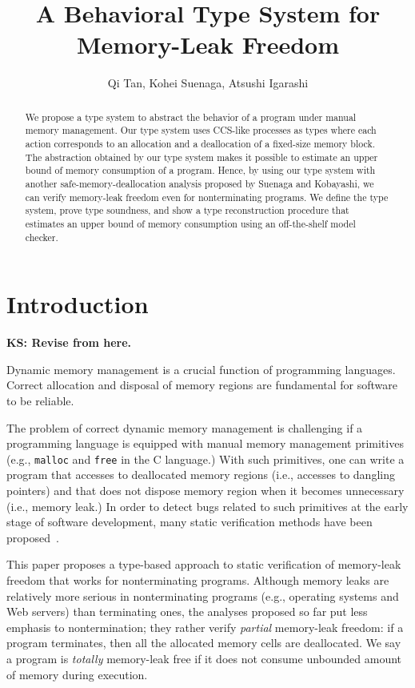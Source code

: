 \documentclass[english]{jssst_ppl} %
\title{A Behavioral Type System for \\ Memory-Leak Freedom}
\author{Qi Tan, Kohei Suenaga, Atsushi Igarashi}
\theoremstyle{definition}
\newcommand\todo[1]{{\bf KS: {#1}}}
\begin{document}
\maketitle
\begin{abstract}
We propose a type system to abstract the behavior of a program under
manual memory management. Our type system uses CCS-like processes as
types where each action corresponds to an allocation and a
deallocation of a fixed-size memory block. The abstraction obtained by
our type system makes it possible to estimate an upper bound of memory
consumption of a program. Hence, by using our type system with another
safe-memory-deallocation analysis proposed by Suenaga and Kobayashi,
we can verify memory-leak freedom even for nonterminating programs.
We define the type system, prove type soundness, and show a type
reconstruction procedure that estimates an upper bound of memory
consumption using an off-the-shelf model checker.
\end{abstract}

\section{Introduction}

\todo{Revise from here.}

Dynamic memory management is a crucial function of programming
languages.  Correct allocation and disposal of memory regions are
fundamental for software to be reliable.

The problem of correct dynamic memory management is challenging if a
programming language is equipped with manual memory management
primitives (e.g., \texttt{malloc} and \texttt{free} in the C
language.)  With such primitives, one can write a program that
accesses to deallocated memory regions (i.e., accesses to dangling
pointers) and that does not dispose memory region when it becomes
unnecessary (i.e., memory leak.)  In order to detect bugs related to
such primitives at the early stage of software development, many
static verification methods have been proposed~\cite{}.

This paper proposes a type-based approach to static verification of
memory-leak freedom that works for nonterminating programs.  Although
memory leaks are relatively more serious in nonterminating programs
(e.g., operating systems and Web servers) than terminating ones, the
analyses proposed so far put less emphasis to nontermination; they
rather verify \emph{partial} memory-leak freedom: if a program
terminates, then all the allocated memory cells are deallocated.  We
say a program is \emph{totally} memory-leak free if it does not
consume unbounded amount of memory during execution.
\end{document}
